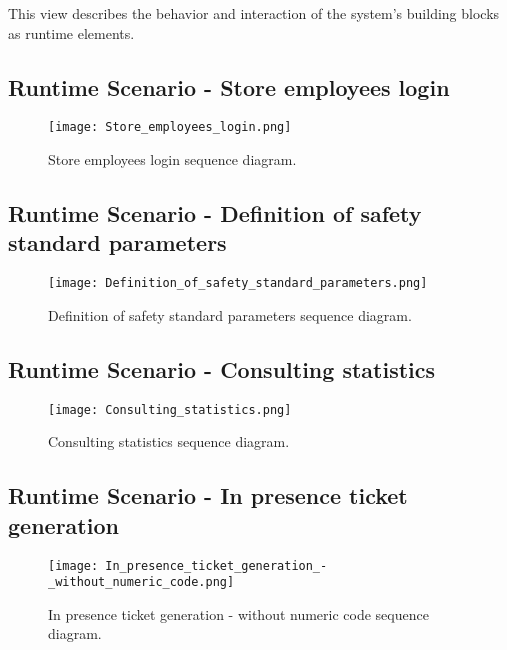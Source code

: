 \documentclass[../../main.tex]{subfiles}
\begin{document}
This view describes the behavior and interaction of the system’s building blocks as runtime elements.


\subsection{Runtime Scenario  - Store employees login}

\begin{figure}[H]
    \centering
    \texttt{[image: Store\_employees\_login.png]}
    \caption{
        Store employees login sequence diagram.
    }
\end{figure}

\subsection{Runtime Scenario  - Definition of safety standard parameters}
\begin{figure}[H]
    \centering
    \texttt{[image: Definition\_of\_safety\_standard\_parameters.png]}
    \caption{
        Definition of safety standard parameters sequence diagram.
    }
\end{figure}


\subsection{Runtime Scenario  - Consulting statistics}
\begin{figure}[H]
    \centering
    \texttt{[image: Consulting\_statistics.png]}
    \caption{
        Consulting statistics sequence diagram.
    }
\end{figure}


\subsection{Runtime Scenario  - In presence ticket generation}
\begin{figure}[H]
    \centering
    \texttt{[image: In\_presence\_ticket\_generation\_-\_without\_numeric\_code.png]}
    \caption{
        In presence ticket generation - without numeric code sequence diagram.
    }
\end{figure}
\end{document}
